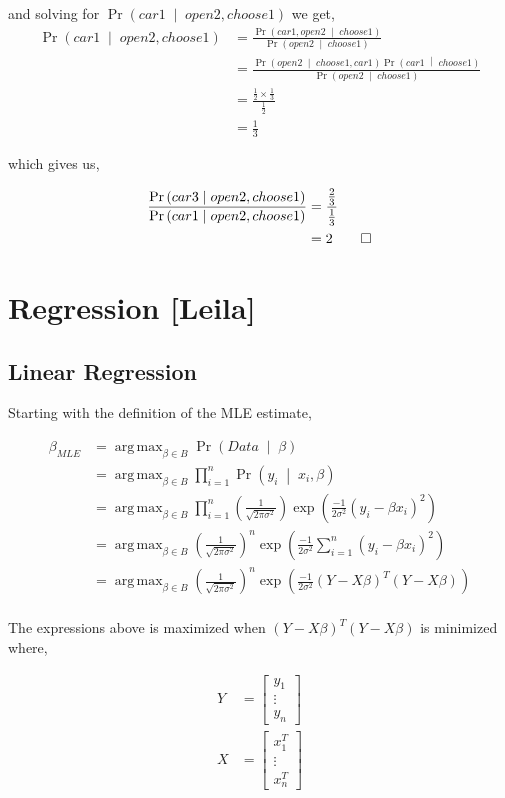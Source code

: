 \documentclass[letterpaper,10pt]{article} %
\newcommand{\pipe}{\;\middle\vert\;}
\newcommand{\condp}[2]{\Pr\left( #1 \pipe #2 \right)}
\newcommand{\pr}[1]{\Pr\left( #1 \right)}
\DeclareMathOperator*{\argmax}{arg\,max}
\newcommand{\prove}[1]{
\begin{Proof}
\begin{align*}
#1
\end{align*}
\end{Proof}
}
\begin{document}
and solving for $\pr{car1 \pipe open2, choose1}$ we get,
\begin{align*}
 \pr{car1 \pipe open2, choose1} &= \frac{\condp{car1, open2}{choose1}}{\condp{open2}{choose1}}\\
 &=\frac{\condp{open2}{choose1,car1}\condp{car1}{choose1}}{\condp{open2}{choose1}} \\
 &=\frac{\tfrac{1}{2} \times \tfrac{1}{3}}{\tfrac{1}{2}} \\
 &=\tfrac{1}{3}
\end{align*}

which gives us,

\prove{
  \frac{\pr{car3 \pipe open2, choose1}}{\pr{car1 \pipe open2, choose1}} &= \frac{\tfrac{2}{3}}{\tfrac{1}{3}} \\
  &= 2 \qedhere
}

\newpage
\section{Regression [Leila]}
\subsection{Linear Regression}
Starting with the definition of the MLE estimate,

\begin{align*}
\beta_{MLE} &= \argmax_{\beta \in B} \condp{Data}{\beta}\\
&= \argmax_{\beta \in B} \prod_{i=1}^n \condp{y_i}{x_i, \beta}\\
&= \argmax_{\beta \in B} \prod_{i=1}^n \left(\frac{1}{\sqrt{2\pi\sigma^2}}\right) \exp\left( \frac{-1}{2\sigma^2} (y_i-\beta x_i)^2 \right) \\
&= \argmax_{\beta \in B} \left(\frac{1}{\sqrt{2\pi\sigma^2}}\right)^n \exp\left( \frac{-1}{2\sigma^2} \sum_{i=1}^n (y_i-\beta x_i)^2 \right) \\
&= \argmax_{\beta \in B} \left(\frac{1}{\sqrt{2\pi\sigma^2}}\right)^n \exp\left( \frac{-1}{2\sigma^2} (Y-X\beta)^T(Y-X\beta) \right) \\
\end{align*}

The expressions above is maximized when $(Y-X\beta)^T(Y-X\beta)$ is minimized where,

\begin{align*}
Y &= \left[ \begin{array}{c}
y_1 \\
\vdots \\
y_n \end{array} \right] \\
X &= \left[ \begin{array}{c}
x_1^T \\
\vdots \\
x_n^T \end{array} \right]
\end{align*}
\end{document}
